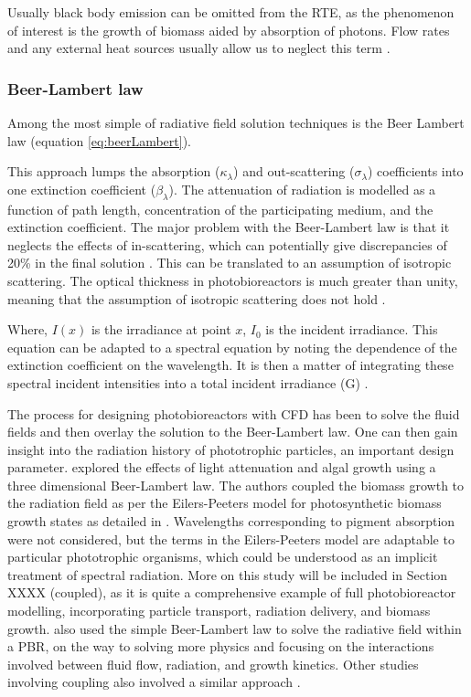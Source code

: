 Usually black body emission can be omitted from the RTE, as the phenomenon of interest is the growth of biomass aided by absorption of photons. Flow rates and any external heat sources usually allow us to neglect this term \cite{Lee1994}.


\subsubsection{Beer-Lambert law}
\label{S:2.3.1}
Among the most simple of radiative field solution techniques is the Beer Lambert law (equation \ref{eq:beerLambert}). 

This approach lumps the absorption ($\kappa_\lambda$) and out-scattering ($\sigma_\lambda$) coefficients into one extinction coefficient ($\beta_\lambda$). The attenuation of radiation is modelled as a function of path length, concentration of the participating medium, and the extinction coefficient. The major problem with the Beer-Lambert law is that it neglects the effects of in-scattering, which can potentially give discrepancies of 20\% in the final solution \cite{Berberoglu2007,Pottier2005,Wang2014a}. This can be translated to an assumption of isotropic scattering. The optical thickness in photobioreactors is much greater than unity, meaning that the assumption of isotropic scattering does not hold \cite{Modest2003}. 


Where, $I(x)$ is the irradiance at point $x$, $I_0$ is the incident irradiance. This equation can be adapted to a spectral equation by noting the dependence of the extinction coefficient on the wavelength. It is then a matter of integrating these spectral incident intensities into a total incident irradiance (G) \cite{Pottier2005}.

The process for designing photobioreactors with CFD has been to solve the fluid fields and then overlay the solution to the Beer-Lambert law. One can then gain insight into the radiation history of phototrophic particles, an important design parameter. \cite{Marshall2010} explored the effects of light attenuation and algal growth using a three dimensional Beer-Lambert law. The authors coupled the biomass growth to the radiation field as per the Eilers-Peeters model for photosynthetic biomass growth states as detailed in \cite{Bechet2013}. Wavelengths corresponding to pigment absorption were not considered, but the terms in the Eilers-Peeters model are adaptable to particular phototrophic organisms, which could be understood as an implicit treatment of spectral radiation. More on this study will be included in Section XXXX (coupled), as it is quite a comprehensive example of full photobioreactor modelling, incorporating particle transport, radiation delivery, and biomass growth. \cite{Nauha2013} also used the simple Beer-Lambert law to solve the radiative field within a PBR, on the way to solving more physics and focusing on the interactions involved between fluid flow, radiation, and growth kinetics. Other studies involving coupling also involved a similar approach \cite{Marshall2011}. 

